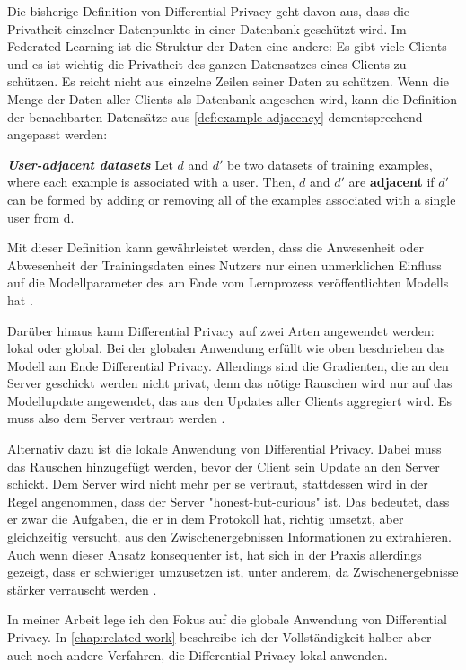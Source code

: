 Die bisherige Definition von Differential Privacy geht davon aus, dass die Privatheit einzelner Datenpunkte in einer Datenbank geschützt wird. Im Federated Learning ist die Struktur der Daten eine andere: Es gibt viele Clients und es ist wichtig die Privatheit des ganzen Datensatzes eines Clients zu schützen. Es reicht nicht aus einzelne Zeilen seiner Daten zu schützen. Wenn die Menge der Daten aller Clients als Datenbank angesehen wird, kann die Definition der benachbarten Datensätze aus  \autoref{def:example-adjacency} dementsprechend angepasst werden:

\begin{definition}\label{def:user-adjacency}
	\emph{\textbf{User-adjacent datasets} \cite{mcmahan:2018}} Let $d$ and $d'$ be two datasets of training examples, where each example is associated with a user. Then, $d$ and $d'$ are \textbf{adjacent} if $d'$ can be formed by adding or removing all of the examples associated with a single user from d.
\end{definition}

Mit dieser Definition kann gewährleistet werden, dass die Anwesenheit oder Abwesenheit der Trainingsdaten eines Nutzers nur einen unmerklichen Einfluss auf die Modellparameter des am Ende vom Lernprozess veröffentlichten Modells hat \cite{mcmahan:2018}.

Darüber hinaus kann Differential Privacy auf zwei Arten angewendet werden: lokal oder global. Bei der globalen Anwendung erfüllt wie oben beschrieben das Modell am Ende Differential Privacy. Allerdings sind die Gradienten, die an den Server geschickt werden nicht privat, denn das nötige Rauschen wird nur auf das Modellupdate angewendet, das aus den Updates aller Clients aggregiert wird. Es muss also dem Server vertraut werden \cite[p.44]{kairouz:2021}.

Alternativ dazu ist die lokale Anwendung von Differential Privacy. Dabei muss das Rauschen hinzugefügt werden, bevor der Client sein Update an den Server schickt. Dem Server wird nicht mehr per se vertraut, stattdessen wird in der Regel angenommen, dass der Server "honest-but-curious" ist. Das bedeutet, dass er zwar die Aufgaben, die er in dem Protokoll hat, richtig umsetzt, aber gleichzeitig versucht, aus den Zwischenergebnissen Informationen zu extrahieren. Auch wenn dieser Ansatz konsequenter ist, hat sich in der Praxis allerdings gezeigt, dass er schwieriger umzusetzen ist, unter anderem, da Zwischenergebnisse stärker verrauscht werden \cite[p.54]{kairouz:2021}.

In meiner Arbeit lege ich den Fokus auf die globale Anwendung von Differential Privacy. In \autoref{chap:related-work} beschreibe ich der Vollständigkeit halber aber auch noch andere Verfahren, die Differential Privacy lokal anwenden.